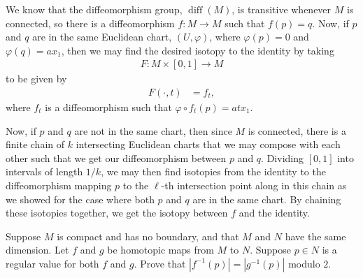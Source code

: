 \documentclass[10pt]{mypackage}
\begin{document}
\begin{solution}
  We know that the diffeomorphism group, $ \operatorname{diff}\left( M \right) $, is transitive whenever $M$ is connected, so there is a diffeomorphism $f\colon M\rightarrow M$ such that $f(p) = q$. Now, if $p$ and $q$ are in the same Euclidean chart, $\left( U,\varphi \right)$, where $\varphi(p) = 0$ and $\varphi(q) = ax_1$, then we may find the desired isotopy to the identity by taking
  \begin{align*}
    F\colon M\times [0,1]\rightarrow M
  \end{align*}
  to be given by
  \begin{align*}
    F\left( \cdot,t \right) &= f_{t},
  \end{align*}
  where $f_{t}$ is a diffeomorphism such that $\varphi\circ f_t(p) = atx_1$.\newline

  Now, if $p$ and $q$ are not in the same chart, then since $M$ is connected, there is a finite chain of $k$ intersecting Euclidean charts that we may compose with each other such that we get our diffeomorphism between $p$ and $q$. Dividing $ \left[ 0,1 \right] $ into intervals of length $1/k$, we may then find isotopies from the identity to the diffeomorphism mapping $p$ to the $\ell$-th intersection point along in this chain as we showed for the case where both $p$ and $q$ are in the same chart. By chaining these isotopies together, we get the isotopy between $f$ and the identity.
\end{solution}
\begin{problem}[Problem 3]
  Suppose $M$ is compact and has no boundary, and that $M$ and $N$ have the same dimension. Let $f$ and $g$ be homotopic maps from $M$ to $N$. Suppose $p\in N$ is a regular value for both $f$ and $g$. Prove that $ \left\vert f^{-1}(p) \right\vert = \left\vert g^{-1}\left( p \right) \right\vert $ modulo $2$.
\end{problem}
\end{document}
